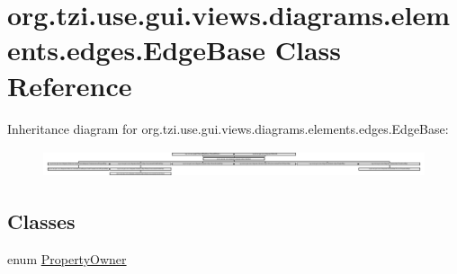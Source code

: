 \hypertarget{classorg_1_1tzi_1_1use_1_1gui_1_1views_1_1diagrams_1_1elements_1_1edges_1_1_edge_base}{\section{org.\-tzi.\-use.\-gui.\-views.\-diagrams.\-elements.\-edges.\-Edge\-Base Class Reference}
\label{classorg_1_1tzi_1_1use_1_1gui_1_1views_1_1diagrams_1_1elements_1_1edges_1_1_edge_base}
}
Inheritance diagram for org.\-tzi.\-use.\-gui.\-views.\-diagrams.\-elements.\-edges.\-Edge\-Base\-:\begin{figure}[H]
\begin{center}
\leavevmode
\includegraphics[height=0.825959cm]{classorg_1_1tzi_1_1use_1_1gui_1_1views_1_1diagrams_1_1elements_1_1edges_1_1_edge_base}
\end{center}
\end{figure}
\subsection*{Classes}
\begin{DoxyCompactItemize}
\item 
enum \hyperlink{enumorg_1_1tzi_1_1use_1_1gui_1_1views_1_1diagrams_1_1elements_1_1edges_1_1_edge_base_1_1_property_owner}{Property\-Owner}
\end{DoxyCompactItemize}

